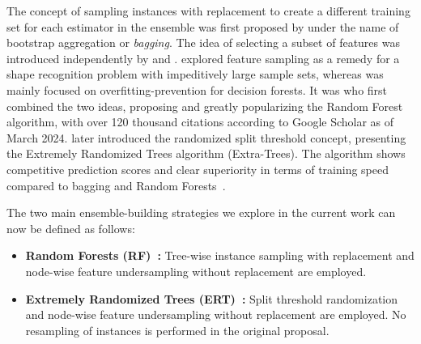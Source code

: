 The concept of sampling instances with replacement to create a different training set for each estimator in the ensemble was first proposed by  under the name of bootstrap aggregation or \emph{bagging}.
%
The idea of selecting a subset of features was introduced independently by  and .  explored feature sampling as a remedy for a shape recognition problem with impeditively large sample sets, whereas  was mainly focused on overfitting-prevention for decision forests.
%
It was  who first combined the two ideas, proposing and greatly popularizing the Random Forest algorithm, with over 120 thousand citations according to Google Scholar as of March 2024.
%
 later introduced the randomized split threshold concept, presenting the Extremely Randomized Trees algorithm (Extra-Trees). The algorithm shows competitive prediction scores and clear superiority in terms of training speed compared to bagging and Random Forests~\cite{geurts2006extremely,schrynemackers2015classifying}.

The two main ensemble-building strategies we explore in the current work can now be defined as follows:
%
\begin{itemize}
    \item \textbf{Random Forests (RF)~\cite{breiman2001random}:} Tree-wise instance sampling with replacement and node-wise feature undersampling without replacement are employed.
    \item \textbf{Extremely Randomized Trees (ERT)~\cite{geurts2006extremely}:} Split threshold randomization and node-wise feature undersampling without replacement are employed. No resampling of instances is performed in the original proposal.
\end{itemize}


